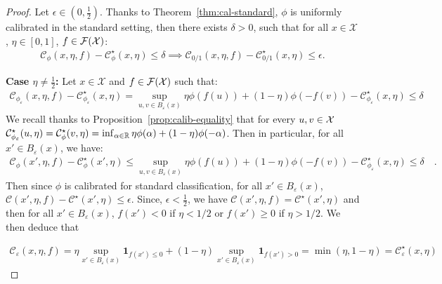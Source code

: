 \begin{proof}

    Let $\epsilon\in(0,\frac{1}{2})$. Thanks to Theorem~\ref{thm:cal-standard}, $\phi$ is uniformly calibrated in the standard setting, then there exists $\delta>0$, such that for all $x\in\mathcal{X}$, $\eta\in [0,1]$, $f\in \mathcal{F}(\mathcal{X})$:
    \begin{align*}
        \mathcal{C}_\phi(x,\eta,f) - \mathcal{C}_\phi^\star(x,\eta)\leq \delta \implies \mathcal{C}_{0/1}(x,\eta,f) - \mathcal{C}_{0/1}^\star(x,\eta)\leq \epsilon.
    \end{align*}
    
    
    \textbf{Case $\eta\neq \frac12$:} Let $x\in\mathcal{X}$ and $f\in \mathcal{F}(\mathcal{X})$ such that: 
    \begin{align*}
    \mathcal{C}_{\phi_\varepsilon}(x,\eta,f) - \mathcal{C}_{\phi_\varepsilon}^\star(x,\eta)
     = \sup_{u,v\in B_\varepsilon(x)}\eta\phi (f(u))+(1-\eta)\phi (-f(v))-\mathcal{C}_{\phi_\varepsilon}^\star(x,\eta)\leq \delta 
    \end{align*}
    We recall thanks to Proposition~\ref{prop:calib-equality} that for every $u,v\in\mathcal{X}$ 
    $\mathcal{C}_{\phi_\varepsilon}^\star(u,\eta) =\mathcal{C}_\phi^\star(v,\eta)=\inf_{\alpha\in\mathbb{R}}\eta \phi(\alpha)+(1-\eta)\phi(-\alpha)$. Then in particular, for all $x'\in B_\varepsilon(x)$, we have:
    \begin{align*}
        \mathcal{C}_{\phi}(x',\eta,f) - \mathcal{C}_{\phi}^\star(x',\eta)\leq \sup_{u,v\in B_\varepsilon(x)}\eta\phi (f(u))+(1-\eta)\phi (-f(v))-\mathcal{C}_{\phi_\varepsilon}^\star(x,\eta)\leq \delta\quad.
    \end{align*} 
    Then since $\phi$ is calibrated for standard classification, for all $x'\in B_\varepsilon(x)$, $\mathcal{C}(x',\eta,f) - \mathcal{C}^\star(x',\eta)\leq \epsilon$. Since,  $\epsilon<\frac{1}{2}$, we have $\mathcal{C}(x',\eta,f) = \mathcal{C}^\star(x',\eta)$ and then for all $x'\in B_\varepsilon(x)$, $f(x')< 0$  if $\eta<1/2$ or $f(x')\geq0$  if $\eta>1/2$. We then deduce that 
    
    \begin{align*}
       \mathcal{C}_{\varepsilon}(x,\eta,f) = \eta \sup_{x'\in B_\varepsilon(x)} \mathbf{1}_{f(x')\leq 0 } +(1-\eta) \sup_{x'\in B_\varepsilon(x)} \mathbf{1}_{f(x')> 0 }
        = \min(\eta,1-\eta)
        = \mathcal{C}_{\varepsilon}^\star(x,\eta)
    \end{align*}
    

\end{proof}
